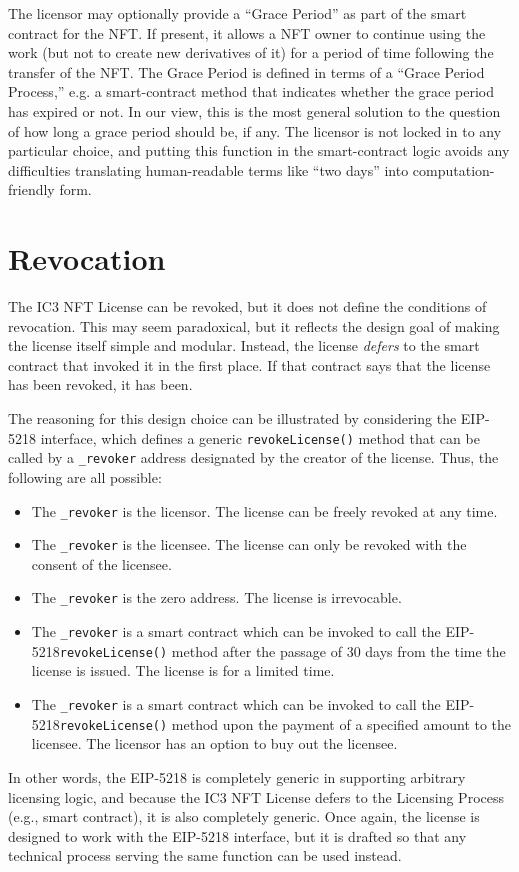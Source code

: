 \documentclass{article}
\newcommand{\eiplicense}{EIP-5218\xspace}
\newcommand{\iccclicense}{IC3 NFT License\xspace}
\renewcommand{\code}[1]{\colorbox{light-gray}{\texttt{#1}}}
\begin{document}
The licensor may optionally provide a ``Grace Period'' as part of the smart contract for the NFT. If present, it allows a NFT owner to continue using the work (but not to create new derivatives of it) for a period of time following the transfer of the NFT. The Grace Period is defined in terms of a ``Grace Period Process,'' e.g. a smart-contract method that indicates whether the grace period has expired or not. In our view, this is the most general solution to the question of how long a grace period should be, if any. The licensor is not locked in to any particular choice, and putting this function in the smart-contract logic avoids any difficulties translating human-readable terms like ``two days'' into computation-friendly form.

\section{Revocation}

The \iccclicense can be revoked, but it does not define the conditions of revocation. This may seem paradoxical, but it reflects the design goal of making the license itself simple and modular. Instead, the license \emph{defers} to the smart contract that invoked it in the first place. If that contract says that the license has been revoked, it has been. 

The reasoning for this design choice can be illustrated by considering the \eiplicense interface, which defines a generic \code{revokeLicense()} method that can be called by a \code{\_revoker} address designated by the creator of the license. Thus, the following are all possible:
\begin{itemize}
\item The \code{\_revoker} is the licensor. The license can be freely revoked at any time.
\item The \code{\_revoker} is the licensee. The license can only be revoked with the consent of the licensee.
\item The \code{\_revoker} is the zero address. The license is irrevocable.
\item The \code{\_revoker} is a smart contract which can be invoked to call the \eiplicense \code{revokeLicense()} method after the passage of 30 days from the time the license is issued. The license is for a limited time.
\item The \code{\_revoker} is a smart contract which can be invoked to call the \eiplicense \code{revokeLicense()} method upon the payment of a specified amount to the licensee. The licensor has an option to buy out the licensee.
\end{itemize}
In other words, the \eiplicense is completely generic in supporting arbitrary licensing logic, and because the \iccclicense defers to the Licensing Process (e.g., smart contract), it is also completely generic. Once again, the license is designed to work with the \eiplicense interface, but it is drafted so that any technical process serving the same function can be used instead.
\end{document}
